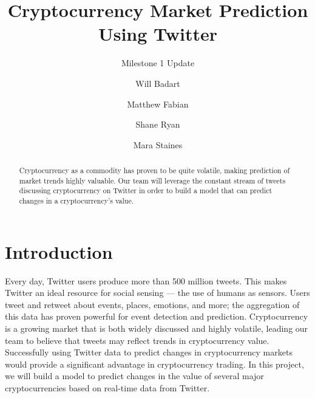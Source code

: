 \documentclass[sigconf]{acmart}
\begin{document}
\renewcommand\footnotetextcopyrightpermission[1]{} %
\pagestyle{plain} %

\title{Cryptocurrency Market Prediction Using Twitter}
\subtitle{Milestone 1 Update}

\author{Will Badart}

\author{Matthew Fabian}

\author{Shane Ryan}

\author{Mara Staines}


\begin{abstract}
Cryptocurrency as a commodity has proven to be quite volatile, making prediction of market trends highly valuable. Our team will leverage the constant stream of tweets discussing cryptocurrency on Twitter in order to build a model that can predict changes in a cryptocurrency’s value.
\end{abstract}

\maketitle


\section{Introduction}
Every day, Twitter users produce more than 500 million tweets. This makes Twitter an ideal resource for social sensing --- the use of humans as sensors. Users tweet and retweet about events, places, emotions, and more; the aggregation of this data has proven powerful for event detection and prediction. Cryptocurrency is a growing market that is both widely discussed and highly volatile, leading our team to believe that tweets may reflect trends in cryptocurrency value. Successfully using Twitter data to predict changes in cryptocurrency markets would provide a significant advantage in cryptocurrency trading. In this project, we will build a model to predict changes in the value of several major cryptocurrencies based on real-time data from Twitter.
\end{document}
